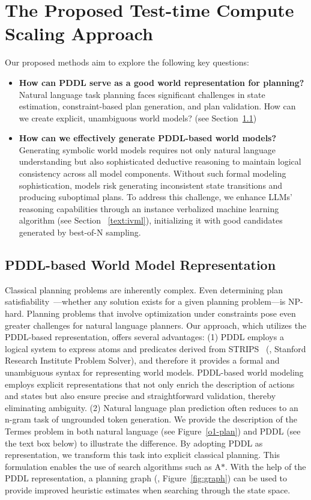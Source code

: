 \section{The Proposed Test-time Compute Scaling Approach}
Our proposed methods aim to explore the following key questions:
\vspace{2mm}
\begin{itemize}[leftmargin=*,nosep]
\setlength\itemsep{0.4em}
    \item \textbf{How can PDDL serve as a good world representation for planning?}
    Natural language task planning faces significant challenges in state estimation, constraint-based plan generation, and plan validation. How can we create explicit, unambiguous world models? (see Section~\ref{swm})
    \item \textbf{How can we effectively generate PDDL-based world models?}
    Generating symbolic world models requires not only natural language understanding but also sophisticated deductive reasoning to maintain logical consistency across all model components.
Without such formal modeling sophistication, models risk generating inconsistent state transitions and producing suboptimal plans.
To address this challenge, we enhance LLMs' reasoning capabilities through an instance verbalized machine learning algorithm (see Section ~\ref{text:ivml}), initializing it with good candidates generated by best-of-N sampling.
\end{itemize}


\subsection{PDDL-based World Model Representation}
\label{swm}
Classical planning problems are inherently complex.
Even determining plan satisfiability~\cite{russell2016artificial}—whether any solution exists for a given planning problem—is NP-hard. 
Planning problems that involve optimization under constraints pose even greater challenges for natural language planners.
Our approach, which utilizes the PDDL-based representation, offers several advantages:
(1) PDDL employs a logical system to express atoms and predicates derived from STRIPS~\cite{fikes1971strips} (\ie, Stanford Research Institute Problem Solver), and therefore it provides a formal and unambiguous syntax for representing world models. 
PDDL-based world modeling employs explicit representations that not only enrich the description of actions and states but also ensure precise and straightforward validation, thereby eliminating ambiguity.
(2) Natural language plan prediction often reduces to an n-gram task of ungrounded token generation. 
We provide the description of the Termes problem in both natural language (see Figure~\ref{o1-plan}) and PDDL (see the text box below) to illustrate the difference.
By adopting PDDL as representation, we transform this task into explicit classical planning. 
This formulation enables the use of search algorithms such as A$\ast$. With the help of the PDDL representation, a planning graph (\eg, Figure~\ref{fig:graph})  can be used to provide improved heuristic estimates when searching through the state space.


